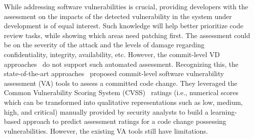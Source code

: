 While addressing software vulnerabilities is crucial, providing developers with the assessment on the impacts of the detected vulnerability in the system under development is of equal interest.
Such knowledge will help better prioritize code review tasks, while showing which areas need patching first.
The assessment could be on the severity of the attack and the levels of damage regarding confidentiality, integrity, availability, etc. However, the commit-level VD approaches~\cite{perl2015vccfinder,zhou2017automated,chen2019large} do not support such automated assessment.
Recognizing this, the state-of-the-art approaches~\cite{deepCVA-ase21} proposed commit-level software vulnerability assessment (VA) tools to assess a committed code change. They leveraged the Common Vulnerability Scoring System (CVSS)~\cite{first-website} ratings (i.e., numerical scores which can be transformed into qualitative representations such as low, medium, high, and critical) manually provided by security analysts to build a learning-based approach to predict assessment ratings for a code change possessing vulnerabilities.
However, the existing VA tools still have limitations.

